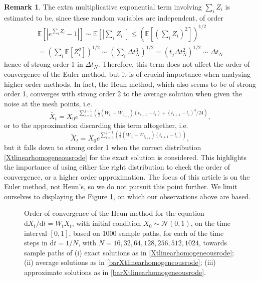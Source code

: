 \documentclass[reqno,12pt]{amsart}
\theoremstyle{plain}%
\theoremstyle{definition}
\newtheorem{rmk}{Remark}[section]
\begin{document}
\begin{rmk}
The extra multiplicative exponential term involving $\sum_i Z_i$ is estimated to be, since these random variables are independent, of order 
\begin{multline*}
    \mathbb{E}\left[\left|e^{\sum_i Z_i} - 1\right|\right] \sim \mathbb{E}\left[\left|\sum_i Z_i\right|\right] \leq \left(\mathbb{E}\left[\left(\sum_i Z_i\right)^2\right]\right)^{1/2} \\
    = \left(\sum_i \mathbb{E}\left[Z_i^2\right]\right)^{1/2} \sim \left(\sum_i \Delta t_N^3 \right)^{1/2} = \left(t_j \Delta t_N^2\right)^{1/2} \sim \Delta t_N
\end{multline*}
hence of strong order 1 in $\Delta t_N$. Therefore, this term does not affect the order of convergence of the Euler method, but it is of crucial importance when analysing higher order methods. In fact, the Heun method, which also seems to be of strong order 1, converges with strong order 2 to the average solution when given the noise at the mesh points, i.e.
\begin{equation}
    \label{barXtlinearhomogeneousrode}
    \bar X_t = X_0 e^{\sum_{i = 0}^{j-1}\left(\frac{1}{2}\left(W_{t_i} + W_{t_{i+1}}\right)(t_{i+1} - t_i) + (t_{i+1}-t_i)^3/24\right)},
\end{equation}
or to the approximation discarding this term altogether, i.e.
\begin{equation}
    \label{tildeXtlinearhomogeneousrode}
    \tilde X_t = X_0 e^{\sum_{i = 0}^{j-1}\left(\frac{1}{2}\left(W_{t_i} + W_{t_{i+1}}\right)(t_{i+1} - t_i)\right)},
\end{equation}
but it falls down to strong order 1 when the correct distribution \eqref{Xtlinearhomogeneousrode} for the exact solution is considered. This highlights the importance of using either the right distribution to check the order of convergence, or a higher order approximation. The focus of this article is on the Euler method, not Heun's, so we do not pursuit this point further. We limit ourselves to displaying the Figure \ref{figheunconvergence}, on which our observations above are based.
\end{rmk}

\begin{figure}[htb]
    \label{figheunconvergence}
    \caption{Order of convergence of the Heun method for the equation $\mathrm{d}X_t/\mathrm{d}t = W_t X_t$, with initial condition $X_0 \sim \mathcal{N}(0, 1)$, on the time interval $[0, 1]$, based on 1000 sample paths, for each of the time steps in $\mathrm{d}t = 1/N$, with $N = 16, 32, 64, 128, 256, 512, 1024$, towards sample paths of (i) exact solutions as in \eqref{Xtlinearhomogeneousrode}; (ii) average solutions as in \eqref{barXtlinearhomogeneousrode}; (iii) approximate solutions as in \eqref{barXtlinearhomogeneousrode}.}
\end{figure}
\end{document}
